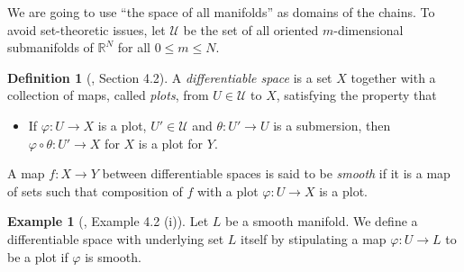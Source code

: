 \documentclass[10pt]{amsart}
\numberwithin{equation}{section}
\theoremstyle{plain}
\theoremstyle{definition}
\newtheorem{definition}[theorem]{Definition}
\newtheorem{example}[theorem]{Example}
\theoremstyle{remark}
\numberwithin{equation}{section}
\newcommand{\R}{\mathbb{R}}
\begin{document}
{We are going to use ``the space of all manifolds'' as domains of the chains. To avoid set-theoretic issues, let $\mathscr{U}$ be the set of all oriented $m$-dimensional submanifolds of $\R^N$ for all $0\leq m \leq N$.

\begin{definition}[\cite{Irie1}, Section 4.2]
	A \emph{differentiable space} is a set $X$ together with a collection of maps, called \emph{plots}, from $U\in \mathscr{U}$ to $X$, satisfying the property that
\begin{itemize}
	\item If $\varphi\colon U\to X$ is a plot, $U'\in \mathscr{U}$ and $\theta\colon U'\to U$ is a submersion, then $\varphi\circ \theta\colon U'\to X$ for $X$ is a plot for $Y$.
\end{itemize}
A map $f\colon X\to Y$ between differentiable spaces is said to be \emph{smooth} if it is a map of sets such that composition of $f$ with a plot $\varphi\colon U\to X$ is a plot.
\end{definition}
\begin{example}[\cite{Irie1}, Example 4.2 (i)]\label{Ex: DiffStr on Manifolds}
	Let $L$ be a smooth manifold. 
	We define a differentiable space with underlying set $L$ itself by stipulating a map $\varphi\colon U\to L$ to be a plot if $\varphi$ is smooth.
\end{example}


}
\end{document}
